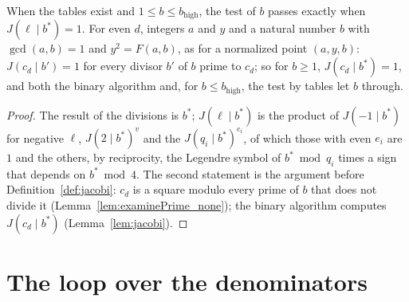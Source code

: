 \begin{lemma}\label{lem:jacobiTest}
  \leanok
  When the tables exist and $1 \le b \le b_{\mathrm{high}}$, the test of $b$ passes exactly when
  $J(\ell \mid b^*) = 1$. For even $d$, integers $a$ and $y$ and a natural number $b$ with
  $\gcd(a, b) = 1$ and $y^2 = F(a, b)$, as for a normalized point $(a, y, b)$: $J(c_d \mid b') = 1$
  for every divisor $b'$ of $b$ prime to $c_d$; so for $b \ge 1$, $J(c_d \mid b^*) = 1$, and both
  the binary algorithm and, for $b \le b_{\mathrm{high}}$, the test by tables let $b$ through.
\end{lemma}

\begin{proof}
  \leanok
  The result of the divisions is $b^*$; $J(\ell \mid b^*)$ is the product of $J(-1 \mid b^*)$ for
  negative $\ell$, $J(2 \mid b^*)^v$ and the $J(q_i \mid b^*)^{e_i}$, of which those with even
  $e_i$ are $1$ and the others, by reciprocity, the Legendre symbol of $b^* \bmod q_i$ times a sign
  that depends on $b^* \bmod 4$. The second statement is the argument before
  Definition~\ref{def:jacobi}: $c_d$ is a square modulo every prime of $b$ that does not divide it
  (Lemma~\ref{lem:examinePrime_none}); the binary algorithm computes $J(c_d \mid b^*)$
  (Lemma~\ref{lem:jacobi}).
\end{proof}

\section{The loop over the denominators}\label{sec:shapes}

